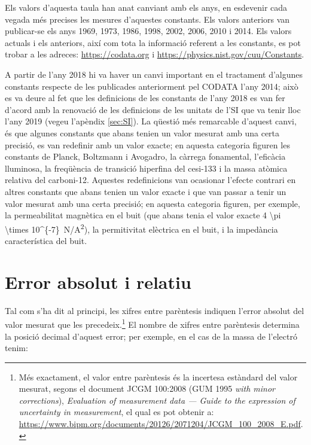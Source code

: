  
Els valors d'aquesta taula  han anat canviant amb els anys, en esdevenir cada vegada més precises les mesures d'aquestes constants. Els valors anteriors van publicar-se els anys 1969, 1973, 1986, 1998, 2002, 2006, 2010 i 2014.  Els  valors actuals i els anteriors, així com tota la informació referent a les constants, es pot trobar   a
les adreces: \href{https://codata.org//}{https://codata.org} i \href{https://physics.nist.gov/cuu/Constants/}{https://physics.nist.gov/cuu/Constants}.


A partir de l'any 2018 hi va haver un canvi important en el tractament d'algunes constants respecte de les publicades anteriorment pel CODATA l'any 2014; això es va deure al fet que les definicions de les constants de l'any 2018 es van fer d'acord amb la renovació de les definicions de les unitats de l'SI que va tenir lloc l'any 2019 (vegeu l'apèndix \ref{sec:SI}). La qüestió més remarcable d'aquest canvi, és que algunes constants que abans tenien un valor mesurat amb una certa precisió, es van redefinir amb un valor exacte; en aquesta categoria figuren les constants de Planck, Boltzmann i Avogadro, la càrrega fonamental, l'eficàcia lluminosa, la freqüència de transició hiperfina del cesi-133 i la massa atòmica relativa del carboni-12. Aquestes redefinicions van ocasionar l'efecte contrari en altres constants que abans tenien un valor exacte i que van passar a tenir un valor mesurat amb una certa precisió; en aquesta categoria figuren, per exemple, la permeabilitat  magnètica en el buit (que abans tenia el valor exacte \qty[parse-numbers = false]{4 \pi \times 10^{-7}}{N/A^2}), la permitivitat elèctrica en el buit, i la impedància característica del buit.



\section{Error absolut i relatiu}\label{sec:err_abs_rel}

Tal com s'ha dit al principi, les xifres entre parèntesis indiquen l'error absolut del valor mesurat que les precedeix.\footnote{Més exactament, el valor entre parèntesis és la incertesa estàndard del valor mesurat, segons el document JCGM 100:2008 (GUM 1995 \textit{with minor
corrections}), \textit{Evaluation of measurement data --- Guide to the expression of uncertainty in
measurement}, el qual es pot obtenir a:  \href{https://www.bipm.org/documents/20126/2071204/JCGM_100_2008_E.pdf/}{https://www.bipm.org/documents/20126/2071204/JCGM\_100\_2008\_E.pdf}.} El nombre de xifres entre parèntesis determina la posició decimal d'aquest error; per exemple, en el cas de la  massa de l'electró tenim:

